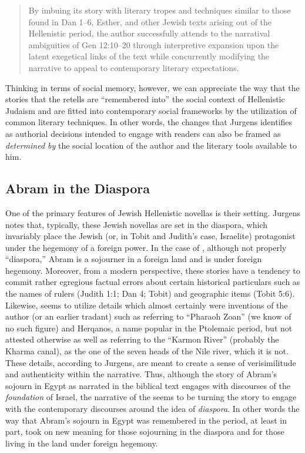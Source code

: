 \begin{quote}
By imbuing its story with literary tropes and techniques similar to those found in Dan 1--6, Esther, and other Jewish texts arising out of the Hellenistic period, the author successfully attends to the narratival ambiguities of Gen 12:10--20 through interpretive expansion upon the latent exegetical links of the text while concurrently modifying the narrative to appeal to contemporary literary expectations.\autocite[27]{jurgens_jsj2018} \end{quote}

Thinking in terms of social memory, however, we can appreciate the way that the stories that the \ga retells are ``remembered into'' the social context of Hellenistic Judaism and are fitted into contemporary social frameworks by the utilization of common literary techniques. In other words, the changes that Jurgens identifies as authorial decisions intended to engage with readers can also be framed as \emph{determined by} the social location of the author and the literary tools available to him.


\subsection{Abram in the Diaspora}

One of the primary features of Jewish Hellenistic novellas is their setting. Jurgens notes that, typically, these Jewish novellas are set in the diaspora, which invariably place the Jewish (or, in Tobit and Judith's case, Israelite) protagonist under the hegemony of a foreign power. In the case of \ga, although not properly ``diaspora,'' Abram is a sojourner in a foreign land and is under foreign hegemony. Moreover, from a modern perspective, these stories have a tendency to commit rather egregious factual errors about certain historical particulars such as the names of rulers (Judith 1:1; Dan 4; Tobit) and geographic items (Tobit 5:6). Likewise, \ga seems to utilize details which almost certainly were inventions of the author (or an earlier tradant) such as referring to ``Pharaoh Zoan'' (we know of no such figure) and Herqanos, a name popular in the Ptolemaic period, but not attested otherwise as well as referring to the ``Karmon River'' (probably the Kharma canal), as the one of the seven heads of the Nile river, which it is not.\autocites[7]{jurgens_jsj2018}[See also][50--59]{machiela_as2010}[197--199]{fitzmyer2004} These details, according to Jurgens, are meant to create a sense of verisimilitude and authenticity within the narrative. Thus, although the story of Abram's sojourn in Egypt as narrated in the biblical text engages with discourses of the \emph{foundation} of Israel, the narrative of the \ga seems to be turning the story to engage with the contemporary discourses around the idea of \emph{diaspora}. In other words the way that Abram's sojourn in Egypt was remembered in the \secondtemple period, at least in part, took on new meaning for those sojourning in the diaspora and for those living in the land under foreign hegemony.

